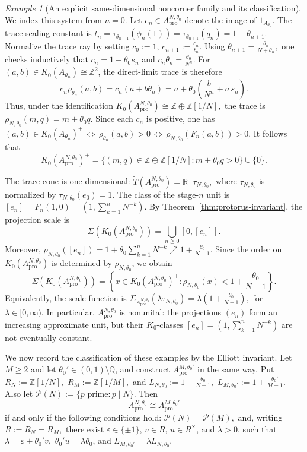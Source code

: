 \documentclass[11pt]{amsart}
\theoremstyle{definition}
\theoremstyle{remark}
\newtheorem{example}[theorem]{Example}
\newcommand{\Z}{\mathbb{Z}}
\newcommand{\R}{\mathbb{R}}
\newcommand{\Q}{\mathbb Q}
\newcommand{\ex}{\mathrm{pro}}
\begin{document}
\begin{example}[An explicit same-dimensional noncorner family and its classification]
We index this system from $n=0$. Let $e_n\in A_{\ex}^{N,\theta_0}$
denote the image of $1_{A_{\theta_n}}$. The trace-scaling constant is $t_n
=
\tau_{\theta_{n+1}}(\phi_n(1))
=
\tau_{\theta_{n+1}}(q_n)
=
1-\theta_{n+1}.$
Normalize the trace ray by setting $c_0:=1$, $c_{n+1}:=\frac{c_n}{t_n}.$
Using $\theta_{n+1}=\frac{\theta_n}{N+\theta_n},$
one checks inductively that $c_n=1+\theta_0s_n$ and $c_n\theta_n=\frac{\theta_0}{N^n}.$ For $(a,b)\in K_0(A_{\theta_n})\cong\Z^2$, the direct-limit trace is therefore
\[
c_n\rho_{\theta_n}(a,b)
=
c_n(a+b\theta_n)
=
a+\theta_0\left(\frac{b}{N^n}+a\,s_n\right).
\]
Thus, under the identification
$K_0(A_{\ex}^{N,\theta_0})\cong\Z\oplus\Z[1/N],$
the trace is $\rho_{N,\theta_0}(m,q)=m+\theta_0q.$
Since each $c_n$ is positive, one has
$(a,b)\in K_0(A_{\theta_n})^+
\,\Leftrightarrow\,
\rho_{\theta_n}(a,b)>0
\,\Leftrightarrow\,
\rho_{N,\theta_0}(F_n(a,b))>0.$
It follows that
\[
K_0(A_{\ex}^{N,\theta_0})^+
=
\{(m,q)\in\Z\oplus\Z[1/N]:m+\theta_0q>0\}\cup\{0\}.
\]

The trace cone is one-dimensional: $\widetilde T(A_{\ex}^{N,\theta_0})=\R_+\tau_{N,\theta_0},$
where $\tau_{N,\theta_0}$ is normalized by $\tau_{N,\theta_0}(e_0)=1.$
The class of the stage-$n$ unit is $[e_n]=F_n(1,0)=\left(1,\sum_{k=1}^nN^{-k}\right).$
By Theorem~\ref{thm:protorus-invariant}, the projection scale is
\[
\Sigma(K_0(A_{\ex}^{N,\theta_0}))
=
\bigcup_{n\geq0}[0,[e_n]].
\]
Moreover, $\rho_{N,\theta_0}([e_n])=1+\theta_0\sum_{k=1}^nN^{-k}
\nearrow
1+\frac{\theta_0}{N-1}.$
Since the order on $K_0(A_{\ex}^{N,\theta_0})$ is determined by
$\rho_{N,\theta_0}$, we obtain
\[
\Sigma(K_0(A_{\ex}^{N,\theta_0}))
=
\left\{
x\in K_0(A_{\ex}^{N,\theta_0})^+:
\rho_{N,\theta_0}(x)<1+\frac{\theta_0}{N-1}
\right\}.
\]
Equivalently, the scale function is $\Sigma_{A_{\ex}^{N,\theta_0}}(\lambda\tau_{N,\theta_0})=\lambda\left(1+\frac{\theta_0}{N-1}\right),$ for $\lambda\in[0,\infty).$
In particular, $A_{\ex}^{N,\theta_0}$ is nonunital: the projections
\((e_n)\) form an increasing approximate unit, but their \(K_0\)-classes $[e_n]=\left(1,\sum_{k=1}^nN^{-k}\right)$
are not eventually constant.

We now record the classification of these examples by the Elliott invariant.
Let $M\geq2$ and let $\theta_0'\in(0,1)\setminus\Q$, and construct
$A_{\ex}^{M,\theta_0'}$ in the same way. Put $R_N:=\Z[1/N],$
$R_M:=\Z[1/M],$ and $L_{N,\theta_0}:=1+\frac{\theta_0}{N-1},$
$L_{M,\theta_0'}:=1+\frac{\theta_0'}{M-1}.$
Also let $\mathcal P(N):=\{p\text{ prime}:p\mid N\}.$
Then
\[
A_{\ex}^{N,\theta_0}\cong A_{\ex}^{M,\theta_0'}
\]
if and only if the following conditions hold:
$\mathcal P(N)=\mathcal P(M),$
and, writing $R:=R_N=R_M,$
there exist $\varepsilon\in\{\pm1\}$, $v\in R$, $u\in R^\times$, and
$\lambda>0$,
such that
$\lambda=\varepsilon+\theta_0'v,$
$\theta_0'u=\lambda\theta_0$, and $L_{M,\theta_0'}=\lambda L_{N,\theta_0}.$


\end{example}
\end{document}
